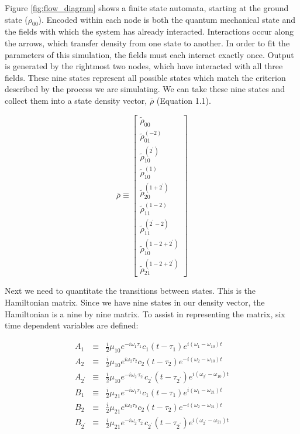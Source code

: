 \documentclass[fontsize=11pt]{scrartcl}
\numberwithin{equation}{section}		%
\numberwithin{figure}{section}			%
\numberwithin{table}{section}				%
\begin{document}
Figure \ref{fig:flow_diagram} shows a finite state automata, starting at the ground state ($\rho_{00}$).
Encoded within each node is both the quantum mechanical state and the fields with which the system has already interacted.
Interactions occur along the arrows, which transfer density from one state to another.
In order to fit the parameters of this simulation, the fields must each interact exactly once.
Output is generated by the rightmost two nodes, which have interacted with all three fields.
These nine states represent all possible states which match the criterion described by the process we are simulating.
We can take these nine states and collect them into a state density vector, $\overline{\rho}$ (Equation 1.1).

\begin{equation}
\overline{\rho} \equiv
\begin{bmatrix}
\tilde{\rho}_{00} \\
\tilde{\rho}_{01}^{(-2)} \\
\tilde{\rho}_{10}^{(2^\prime)} \\
\tilde{\rho}_{10}^{(1)} \\
\tilde{\rho}_{20}^{(1+2^\prime)} \\
\tilde{\rho}_{11}^{(1-2)} \\
\tilde{\rho}_{11}^{(2^\prime-2)} \\
\tilde{\rho}_{10}^{(1-2+2^\prime)} \\
\tilde{\rho}_{21}^{(1-2+2^\prime)}
\end{bmatrix}
\end{equation}

Next we need to quantitate the transitions between states.
This is the Hamiltonian matrix.
Since we have nine states in our density vector, the Hamiltonian is a nine by nine matrix.
To assist in representing the matrix, six time dependent variables are defined:

\begin{eqnarray}
A_1 &\equiv& \frac{i}{2}\mu_{10}e^{-i\omega_1\tau_1}c_1(t-\tau_1)e^{i(\omega_1-\omega_{10})t} \\
A_2 &\equiv& \frac{i}{2}\mu_{10}e^{i\omega_2\tau_2}c_2(t-\tau_2)e^{-i(\omega_2-\omega_{10})t} \\
A_{2^\prime} &\equiv& \frac{i}{2}\mu_{10}e^{-i\omega_{2^\prime}\tau_{2^\prime}}c_{2^\prime}(t-\tau_{2^\prime})e^{i(\omega_{2^\prime}-\omega_{10})t} \\
B_1 &\equiv& \frac{i}{2}\mu_{21}e^{-i\omega_1\tau_1}c_1(t-\tau_1)e^{i(\omega_1-\omega_{21})t} \\
B_2 &\equiv& \frac{i}{2}\mu_{21}e^{i\omega_2\tau_2}c_2(t-\tau_2)e^{-i(\omega_2-\omega_{21})t} \\
B_{2^\prime} &\equiv& \frac{i}{2}\mu_{21}e^{-i\omega_{2^\prime}\tau_{2^\prime}}c_{2^\prime}(t-\tau_{2^\prime})e^{i(\omega_{2^\prime}-\omega_{21})t}
\end{eqnarray}
\end{document}

